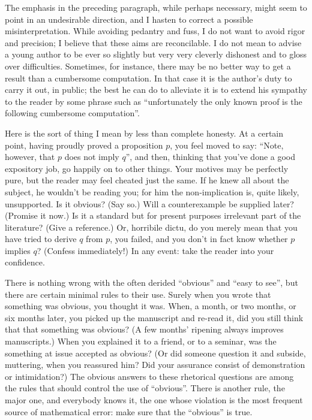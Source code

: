 \documentclass[12pt]{article}
\begin{document}
The emphasis in the preceding paragraph, while perhaps necessary, might seem to point in an undesirable direction, and I hasten to correct a possible misinterpretation. While avoiding pedantry and fuss, I do not want to avoid rigor and precision; I believe that these aims are reconcilable. I do not mean to advise a young author to be ever so slightly but very very cleverly dishonest and to gloss over difficulties. Sometimes, for instance, there may be no better way to get a result than a cumbersome computation. In that case it is the author's duty to carry it out, in public; the best he can do to alleviate it is to extend his sympathy to the reader by some phrase such as ``unfortunately the only known proof is the following cumbersome computation''. 

Here is the sort of thing I mean by less than complete honesty. At a certain point, having proudly proved a proposition $p$, you feel moved to say: ``Note, however, that $p$ does not imply $q$'', and then, thinking that you've done a good expository job, go happily on to other things. Your motives may be perfectly pure, but the reader may feel cheated just the same. If he knew all about the subject, he wouldn't be reading you; for him the non-implication is, quite likely, unsupported. Is it obvious? (Say so.) Will a counterexample be supplied later? (Promise it now.) Is it a standard but for present purposes irrelevant part of the literature? (Give a reference.) Or, horribile dictu, do you merely mean that you have tried to derive $q$ from $p$, you failed, and you don't in fact know whether $p$ implies $q$? (Confess immediately!) In any event: take the reader into your confidence. 

There is nothing wrong with the often derided ``obvious'' and ``easy to see'', but there are certain minimal rules to their use. Surely when you wrote that something was obvious, you thought it was. When, a month, or two months, or six months later, you picked up the manuscript and re-read it, did you still think that that something was obvious? (A few months' ripening always improves manuscripts.) When you explained it to a friend, or to a seminar, was the something at issue accepted as obvious? (Or did someone question it and subside, muttering, when you reassured him? Did your assurance consist of demonstration or intimidation?) The obvious answers to these rhetorical questions are among the rules that should control the use of ``obvious''. There is another rule, the major one, and everybody knows it, the one whose violation is the most frequent source of mathematical error: make sure that the ``obvious'' is true. 
\end{document}
